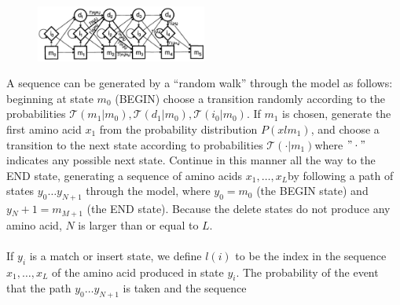 \begin{figure}[ht]
		\centering
		\includegraphics[width=0.5\textwidth]{HMM}
		\caption{\label{fig:HMM}}
	\end{figure}
\noindent
A sequence can be generated by a “random walk” through the model as follows: beginning at state $m_0$ (BEGIN) choose a transition  randomly according to the probabilities $\mathcal{T}(m_1|m_0),\mathcal{T}(d_1|m_0),\mathcal{T}(i_0|m_0)$. If $m_1$ is chosen, generate the first amino acid $x_1$ from the probability distribution $P(xlm_1)$, and choose a transition to the next state according to probabilities $\mathcal{T}(\cdot |m_1)$where $"\cdot"$ indicates any possible next state. Continue in this manner all the way to the END state, generating a sequence of amino acids $x_1, \dots, x_L$by following a path of states $y_0 \dots y_{N+1}$ through the model, where $y_0 = m_0$ (the BEGIN state) and $y{_N+1}=m_{M+1}$ (the END state). Because the delete states do not produce any amino acid, $N$ is larger than or equal to $L$. 
\\
\\
\noindent
If $y_i$ is a match or insert state, we define $l(i)$ to be the index in the sequence $x_1, \dots, x_L$ of the amino acid produced in state $y_i$. The probability of the event that the path $y_{0} \dots y_{N+1}$ is taken and the sequence


